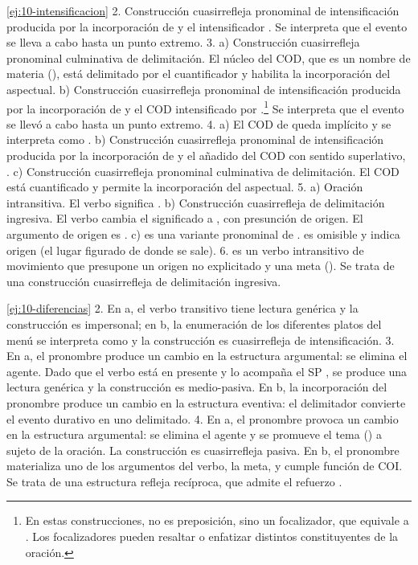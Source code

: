 \begin{solucion}{\ref{ej:10-intensificacion}}
2. Construcción cuasirrefleja pronominal de intensificación producida por la
incorporación de  y el intensificador . Se interpreta que
el evento se lleva a cabo hasta un punto extremo. 3. a) Construcción
cuasirrefleja pronominal culminativa de delimitación. El núcleo del COD, que es
un nombre de materia (), está delimitado por el cuantificador
 y habilita la incorporación del  aspectual. b)
Construcción cuasirrefleja pronominal de intensificación producida por la
incorporación de  y el COD intensificado por .\footnote{En
estas construcciones,  no es preposición, sino un focalizador, que
equivale a . Los focalizadores pueden resaltar o enfatizar
distintos constituyentes de la oración.} Se interpreta que el evento se llevó a
cabo hasta un punto extremo. 4. a) El COD de  queda implícito y se
interpreta como . b)
Construcción cuasirrefleja pronominal de intensificación producida por la
incorporación de  y el añadido del COD con sentido superlativo,
. c) Construcción cuasirrefleja pronominal culminativa de
delimitación. El COD está cuantificado y permite la incorporación del
 aspectual. 5. a) Oración intransitiva. El verbo significa . b) Construcción cuasirrefleja de delimitación ingresiva. El verbo
cambia el significado a , con presunción de origen. El
argumento de origen es . c)  es una variante
pronominal de .  es omisible y  indica
origen (el lugar figurado de donde se sale). 6.  es un verbo
intransitivo de movimiento que presupone un origen no explicitado y una meta
(). Se trata de una construcción cuasirrefleja de
delimitación ingresiva.
\end{solucion}

\begin{solucion}{\ref{ej:10-diferencias}}
2. En a, el verbo transitivo tiene lectura genérica y la construcción es
impersonal; en b, la enumeración de los diferentes platos del menú se interpreta
como  y la construcción es cuasirrefleja de
intensificación. 3. En a, el pronombre  produce un cambio en la
estructura argumental: se elimina el agente. Dado que el verbo está en presente y
lo acompaña el SP , se produce una lectura genérica y la
construcción es medio-pasiva. En b, la incorporación del pronombre produce un
cambio en la estructura eventiva: el  delimitador convierte el evento
durativo  en uno delimitado. 4. En a, el pronombre 
provoca un cambio en la estructura argumental: se elimina el agente y se
promueve el tema () a sujeto de la oración. La
construcción es cuasirrefleja pasiva. En b, el pronombre  materializa
uno de los argumentos del verbo, la meta, y cumple función de COI. Se trata de
una estructura refleja recíproca, que admite el refuerzo .
\end{solucion}

